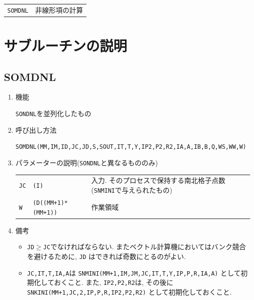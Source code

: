 \vspace{1em}
\begin{tabular}{ll}
{\tt SOMDNL} & 非線形項の計算
\end{tabular}


\section{サブルーチンの説明}


\subsection{SOMDNL}

\begin{enumerate}

\item 機能

 {\tt SONDNL}を並列化したもの

\item 呼び出し方法 

{\tt SOMDNL(MM,IM,ID,JC,JD,S,SOUT,IT,T,Y,IP2,P2,R2,IA,A,IB,B,Q,WS,WW,W)}
  
\item パラメーターの説明({\tt SONDNL}と異なるもののみ)

\begin{tabular}{lll}
{\tt JC} & {\tt (I)} & 入力. そのプロセスで保持する南北格子点数
                        ({\tt SNMINI}で与えられたもの)\\
{\tt W}  & {\tt (D((MM+1)*(MM+1))} & 作業領域
\end{tabular}

\item 備考

\begin{itemize}

\item {\tt JD}$\ge${\tt JC}でなければならない.
   またベクトル計算機においてはバンク競合を避けるために, {\tt JD}
   はできれば奇数にとるのがよい.

\item {\tt JC,IT,T,IA,A}は 
      {\tt SNMINI(MM+1,IM,JM,JC,IT,T,Y,IP,P,R,IA,A)} として初期化しておくこと.
       また, {\tt IP2,P2,R2}は, その後に
      {\tt SNKINI(MM+1,JC,2,IP,P,R,IP2,P2,R2)} として初期化しておくこと.

 \end{itemize}

\end{enumerate}


